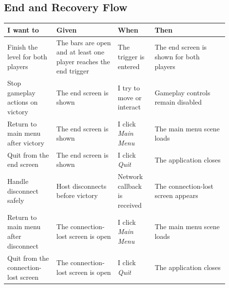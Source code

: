 \subsection*{End and Recovery Flow}
\begin{table}[H]
\centering
\caption{User Stories: End and Recovery Flow}
\label{tab:userstories-en-d-recovery}
\begin{longtable}{|>{\centering\arraybackslash}m{0.20\linewidth}|>{\centering\arraybackslash}m{0.25\linewidth}|>{\centering\arraybackslash}m{0.15\linewidth}|>{\centering\arraybackslash}m{0.30\linewidth}|}
\hline
\hline
\textbf{I want to} & \textbf{Given} & \textbf{When} & \textbf{Then} \\
\hline
Finish the level for both players & The bars are open and at least one player reaches the end trigger & The trigger is entered & The end screen is shown for both players \\
\hline
Stop gameplay actions on victory & The end screen is shown & I try to move or interact & Gameplay controls remain disabled \\
\hline
Return to main menu after victory & The end screen is shown & I click \textit{Main Menu} & The main menu scene loads \\
\hline
Quit from the end screen & The end screen is shown & I click \textit{Quit} & The application closes \\
\hline
Handle disconnect safely & Host disconnects before victory & Network callback is received & The connection-lost screen appears \\
\hline
Return to main menu after disconnect & The connection-lost screen is open & I click \textit{Main Menu} & The main menu scene loads \\
\hline
Quit from the connection-lost screen & The connection-lost screen is open & I click \textit{Quit} & The application closes \\
\hline
\end{longtable}
\addtocounter{table}{-1}
\end{table}
